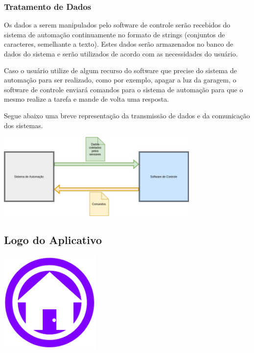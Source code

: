 \subsubsection{Tratamento de Dados}
\par Os dados a serem manipulados pelo software de controle serão recebidos do sistema de automação continuamente no formato de strings (conjuntos de caracteres, semelhante a texto). Estes dados serão armazenados no banco de dados do sistema e serão utilizados de acordo com as necessidades do usuário.
\par Caso o usuário utilize de algum recurso do software que precise do sistema de automação para ser realizado, como por exemplo, apagar a luz da garagem, o software de controle enviará comandos para o sistema de automação para que o mesmo realize a tarefa e mande de volta uma resposta.
\par Segue abaixo uma breve representação da transmissão de dados e da comunicação dos sistemas.

\begin{center}
\includegraphics[width=10cm]{figuras/componentes}
\end{center}

\subsection{Logo do Aplicativo}

\begin{center}
\includegraphics[width=5cm]{figuras/pi1}
\end{center}

